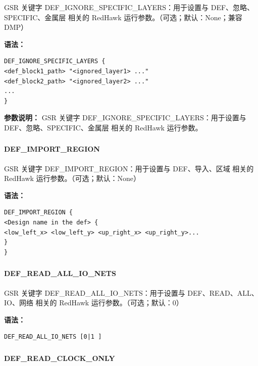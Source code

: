 GSR 关键字 DEF_IGNORE_SPECIFIC_LAYERS：用于设置与 DEF、忽略、SPECIFIC、金属层 相关的 RedHawk 运行参数。（可选；默认：None；兼容 DMP）

\textbf{语法：}
\begin{lstlisting}
DEF_IGNORE_SPECIFIC_LAYERS {
<def_block1_path> "<ignored_layer1> ..."
<def_block2_path> "<ignored_layer2> ..."
...
}
\end{lstlisting}

\textbf{参数说明：}
GSR 关键字 DEF\_IGNORE\_SPECIFIC\_LAYERS：用于设置与 DEF、忽略、SPECIFIC、金属层 相关的 RedHawk 运行参数。

\subsubsection{}
\paragraph*{DEF_IMPORT_REGION}

GSR 关键字 DEF_IMPORT_REGION：用于设置与 DEF、导入、区域 相关的 RedHawk 运行参数。（可选；默认：None）

\textbf{语法：}
\begin{lstlisting}
DEF_IMPORT_REGION {
<Design name in the def> {
<low_left_x> <low_left_y> <up_right_x> <up_right_y>...
}
}
\end{lstlisting}

\subsubsection{}
\paragraph*{DEF_READ_ALL_IO_NETS}

GSR 关键字 DEF_READ_ALL_IO_NETS：用于设置与 DEF、READ、ALL、IO、网络 相关的 RedHawk 运行参数。（可选；默认：0）

\textbf{语法：}
\begin{lstlisting}
DEF_READ_ALL_IO_NETS [0|1 ]
\end{lstlisting}

\subsubsection{}
\paragraph*{DEF_READ_CLOCK_ONLY}

